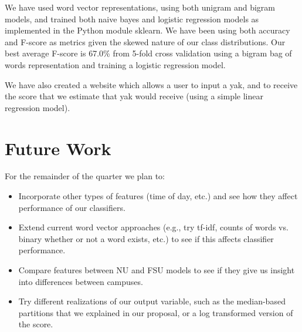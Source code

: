 \documentclass{sigchi}
\begin{document}
We have used word vector representations, using both unigram and bigram models,
and trained both naive bayes and logistic regression models as implemented in
the Python module sklearn. We have been using both accuracy and F-score as
metrics given the skewed nature of our class distributions. Our best average
F-score is 67.0\% from 5-fold cross validation using a bigram bag of words
representation and training a logistic regression model.

We have also created a website which allows a user to input a yak, and to
receive the score that we estimate that yak would receive (using a simple linear
regression model).

\section{Future Work}

For the remainder of the quarter we plan to:

\begin{itemize}
\item Incorporate other types of features (time of day, etc.) and see how they
affect performance of our classifiers.
\item Extend current word vector approaches (e.g., try tf-idf, counts of words
vs. binary whether or not a word exists, etc.) to see if this affects classifier
performance.

\item Compare features between NU and FSU models to see if they give us
insight into differences between campuses.

\item Try different realizations of our output variable, such as the
median-based partitions that we explained in our proposal, or a log transformed
version of the score.

\end{itemize}

%  
\end{document}
